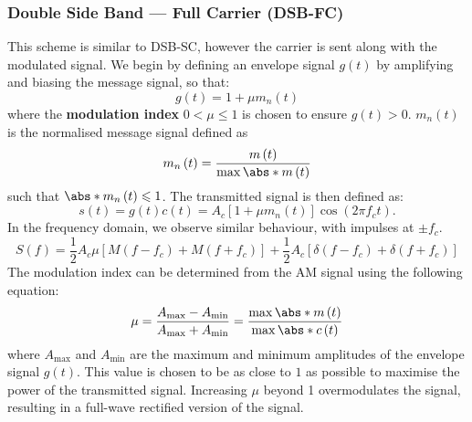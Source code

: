 \documentclass{article}
\begin{document}
\subsubsection{Double Side Band --- Full Carrier (DSB-FC)}
This scheme is similar to DSB-SC, however the carrier is sent along with the modulated signal.
We begin by defining an envelope signal \(g\left( t \right)\) by amplifying and biasing the message signal, so that:
\begin{equation*}
    g\left( t \right) = 1 + \mu m_n\left( t \right)
\end{equation*}
where the \textbf{modulation index} \(0 < \mu \leqslant 1\) is chosen to ensure \(g\left( t \right) > 0\).
\(m_n\left( t \right)\) is the normalised message signal defined as
\begin{equation*}
    m_n\left( t \right) = \frac{m\left( t \right)}{\max{\abs*{m\left( t \right)}}}
\end{equation*}
such that \(\abs*{m_n\left( t \right)} \leqslant 1\).
The transmitted signal is then defined as:
\begin{equation*}
    s\left( t \right) = g\left( t \right) c\left( t \right) = A_c \left[ 1 + \mu m_n\left( t \right) \right] \cos{\left( 2 \pi f_c t \right)}.
\end{equation*}
In the frequency domain, we observe similar behaviour, with impulses at \(\pm f_c\).
\begin{equation*}
    S\left( f \right) = \frac{1}{2} A_c \mu \left[ M\left( f - f_c \right) + M\left( f + f_c \right) \right] + \frac{1}{2} A_c \left[ \delta\left( f - f_c \right) + \delta\left( f + f_c \right) \right]
\end{equation*}
The modulation index can be determined from the AM signal using the following equation:
\begin{equation*}
    \mu = \frac{A_{\mathrm{max}} - A_{\mathrm{min}}}{A_{\mathrm{max}} + A_{\mathrm{min}}} = \frac{\max{\abs*{m\left( t \right)}}}{\max{\abs*{c\left( t \right)}}} %
\end{equation*}
where \(A_{\mathrm{max}}\) and \(A_{\mathrm{min}}\) are the maximum and minimum amplitudes of the envelope signal \(g\left( t \right)\). %
This value is chosen to be as close to \(1\) as possible to maximise the power of the transmitted signal. Increasing \(\mu\) beyond
1 overmodulates the signal, resulting in a full-wave rectified version of the signal.
\end{document}
